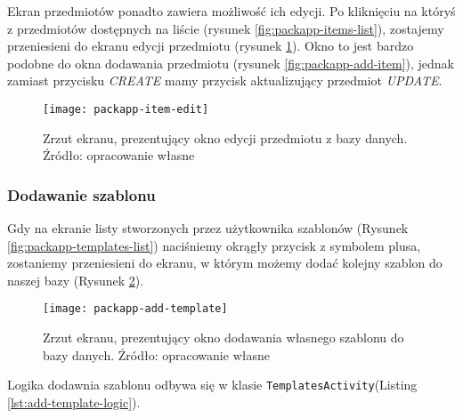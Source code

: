 \documentclass[a4paper,12pt]{article}
\begin{document}
Ekran przedmiotów ponadto zawiera możliwość ich edycji. Po kliknięciu na któryś z przedmiotów dostępnych na liście (rysunek \ref{fig:packapp-items-list}), zostajemy przeniesieni do ekranu edycji przedmiotu (rysunek \ref{fig:packapp-item-edit}). Okno to jest bardzo podobne do okna dodawania przedmiotu (rysunek \ref{fig:packapp-add-item}), jednak zamiast przycisku \textit{CREATE} mamy przycisk aktualizujący przedmiot \textit{UPDATE}.

\begin{figure}[H]
    \centering
    \texttt{[image: packapp-item-edit]}
    \caption{Zrzut ekranu, prezentujący okno edycji przedmiotu z bazy danych. Źródło: opracowanie własne}
    \label{fig:packapp-item-edit}
\end{figure}

\subsubsection{Dodawanie szablonu} \label{szablon}

Gdy na ekranie listy stworzonych przez użytkownika szablonów (Rysunek \ref{fig:packapp-templates-list}) naciśniemy okrągły przycisk z symbolem plusa, zostaniemy przeniesieni do ekranu, w którym możemy dodać kolejny szablon do naszej bazy (Rysunek \ref{fig:packapp-add-template}).

\begin{figure}[H]
    \centering
    \texttt{[image: packapp-add-template]}
    \caption{Zrzut ekranu, prezentujący okno dodawania własnego szablonu do bazy danych. Źródło: opracowanie własne}
    \label{fig:packapp-add-template}
\end{figure}
Logika dodawnia szablonu odbywa się w klasie \texttt{TemplatesActivity}(Listing \ref{lst:add-template-logic}).
\end{document}

